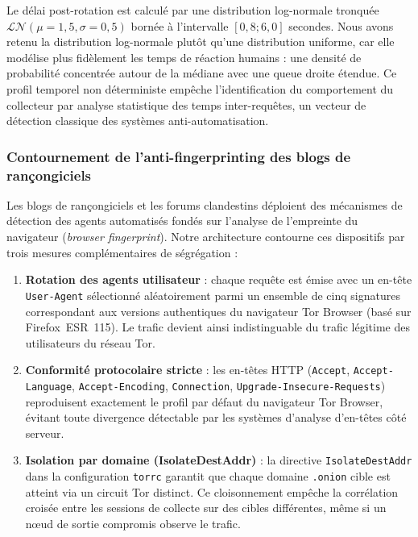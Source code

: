 Le délai post-rotation est calculé par une distribution log-normale tronquée $\mathcal{LN}(\mu=1{,}5, \sigma=0{,}5)$ bornée à l'intervalle $[0{,}8; 6{,}0]$ secondes. Nous avons retenu la distribution log-normale plutôt qu'une distribution uniforme, car elle modélise plus fidèlement les temps de réaction humains : une densité de probabilité concentrée autour de la médiane avec une queue droite étendue. Ce profil temporel non déterministe empêche l'identification du comportement du collecteur par analyse statistique des temps inter-requêtes, un vecteur de détection classique des systèmes anti-automatisation.

\subsubsection{Contournement de l'anti-fingerprinting des blogs de rançongiciels}

Les blogs de rançongiciels et les forums clandestins déploient des mécanismes de détection des agents automatisés fondés sur l'analyse de l'empreinte du navigateur (\textit{browser fingerprint}). Notre architecture contourne ces dispositifs par trois mesures complémentaires de ségrégation :

\begin{enumerate}
    \item \textbf{Rotation des agents utilisateur} : chaque requête est émise avec un en-tête \texttt{User-Agent} sélectionné aléatoirement parmi un ensemble de cinq signatures correspondant aux versions authentiques du navigateur Tor Browser (basé sur Firefox~ESR~115). Le trafic devient ainsi indistinguable du trafic légitime des utilisateurs du réseau Tor.
    \item \textbf{Conformité protocolaire stricte} : les en-têtes HTTP (\texttt{Accept}, \texttt{Accept-Language}, \texttt{Accept-Encoding}, \texttt{Connection}, \texttt{Upgrade-Insecure-Requests}) reproduisent exactement le profil par défaut du navigateur Tor Browser, évitant toute divergence détectable par les systèmes d'analyse d'en-têtes côté serveur.
    \item \textbf{Isolation par domaine (IsolateDestAddr)} : la directive \texttt{IsolateDestAddr} dans la configuration \texttt{torrc} garantit que chaque domaine \texttt{.onion} cible est atteint via un circuit Tor distinct. Ce cloisonnement empêche la corrélation croisée entre les sessions de collecte sur des cibles différentes, même si un n\oe ud de sortie compromis observe le trafic.
\end{enumerate}

